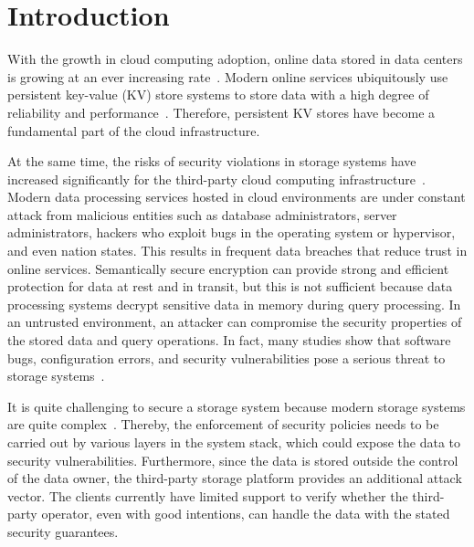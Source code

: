\section{Introduction}
With the growth in cloud computing adoption, online data stored in data centers is growing at an ever 
increasing rate~\cite{bhatotia2012shredder}. Modern online services ubiquitously use persistent key-value (KV) store systems to store data with a high degree of reliability and performance~\cite{bailleu2019speicher}. Therefore, persistent KV stores have become a fundamental part of the cloud infrastructure.

At the same time, the risks of security violations in storage systems have increased significantly for the third-party cloud computing infrastructure~\cite{santos2009towards}. Modern data processing services hosted in cloud environments are under constant attack from malicious entities such as database administrators, server administrators, hackers who exploit bugs in the operating system or hypervisor, and even nation states. This results in frequent data breaches that reduce trust in online services. Semantically secure encryption can provide strong and efficient protection for data at rest and in transit, but this is not sufficient because data processing systems decrypt sensitive data in memory during query processing. In an untrusted environment, an attacker can compromise the security properties of the stored data and query operations. In fact, many studies show that software bugs, configuration errors, and security vulnerabilities pose a serious threat to storage systems~\cite{gunawi2014bugs}.

It is quite challenging to secure a storage system because modern storage systems are quite complex~\cite{lu2013study}. Thereby, the enforcement of security policies needs to be carried out by various layers in the system stack, which could expose the data to security vulnerabilities. Furthermore, since the data is stored outside the control of the data owner, the third-party storage platform provides an additional attack vector. The clients currently have limited support to verify whether the third-party operator, even with good intentions, can handle the data with the stated security guarantees.

